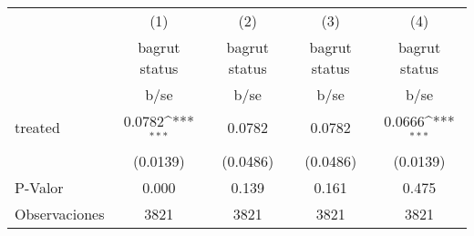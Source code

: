 {
\def\sym#1{\ifmmode^{#1}\else\(^{#1}\)\fi}
\begin{tabular}{l*{4}{c}}
\hline\hline
                    &\multicolumn{1}{c}{(1)}&\multicolumn{1}{c}{(2)}&\multicolumn{1}{c}{(3)}&\multicolumn{1}{c}{(4)}\\
                    &\multicolumn{1}{c}{bagrut status}&\multicolumn{1}{c}{bagrut status}&\multicolumn{1}{c}{bagrut status}&\multicolumn{1}{c}{bagrut status}\\
                    &        b/se         &        b/se         &        b/se         &        b/se         \\
\hline
treated             &      0.0782\sym{***}&      0.0782         &      0.0782         &      0.0666\sym{***}\\
                    &    (0.0139)         &    (0.0486)         &    (0.0486)         &    (0.0139)         \\
\hline
P-Valor             &       0.000         &       0.139         &       0.161         &       0.475         \\
Observaciones       &        3821         &        3821         &        3821         &        3821         \\
\hline\hline
\end{tabular}
}
